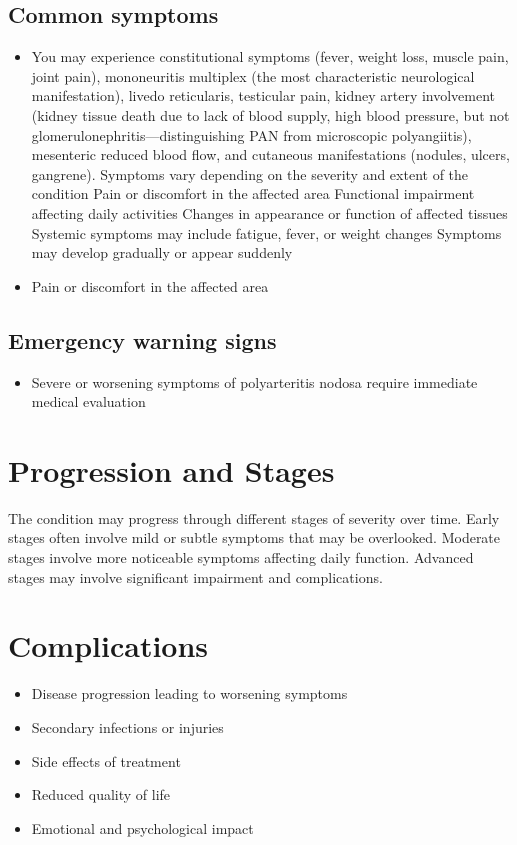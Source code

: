 \subsection{Common symptoms}
\begin{itemize}[noitemsep]
  \item You may experience constitutional symptoms (fever, weight loss, muscle pain, joint pain), mononeuritis multiplex (the most characteristic neurological manifestation), livedo reticularis, testicular pain, kidney artery involvement (kidney tissue death due to lack of blood supply, high blood pressure, but not glomerulonephritis---distinguishing PAN from microscopic polyangiitis), mesenteric reduced blood flow, and cutaneous manifestations (nodules, ulcers, gangrene). Symptoms vary depending on the severity and extent of the condition Pain or discomfort in the affected area Functional impairment affecting daily activities Changes in appearance or function of affected tissues Systemic symptoms may include fatigue, fever, or weight changes Symptoms may develop gradually or appear suddenly
  \item Pain or discomfort in the affected area
  \end{itemize}

\subsection{Emergency warning signs}
\begin{itemize}[noitemsep]
  \item Severe or worsening symptoms of polyarteritis nodosa require immediate medical evaluation
\end{itemize}
\section{Progression and Stages}
The condition may progress through different stages of severity over time. Early stages often involve mild or subtle symptoms that may be overlooked. Moderate stages involve more noticeable symptoms affecting daily function. Advanced stages may involve significant impairment and complications.
\section{Complications}
\begin{itemize}[noitemsep]
  \item Disease progression leading to worsening symptoms
  \item Secondary infections or injuries
  \item Side effects of treatment
  \item Reduced quality of life
  \item Emotional and psychological impact
\end{itemize}
